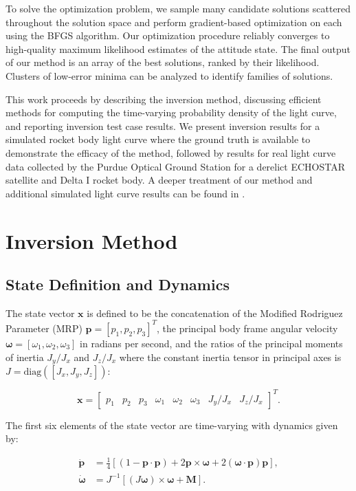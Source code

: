 \documentclass[a4paper,twocolumn]{spaceDebrisC} %
\newcommand{\vctr}[1]{\bm{#1}}
\begin{document}
To solve the optimization problem, we sample many candidate solutions scattered throughout the solution space and perform gradient-based optimization on each using the BFGS algorithm. Our optimization procedure reliably converges to high-quality maximum likelihood estimates of the attitude state. The final output of our method is an array of the best solutions, ranked by their likelihood. Clusters of low-error minima can be analyzed to identify families of solutions.

This work proceeds by describing the inversion method, discussing efficient methods for computing the time-varying probability density of the light curve, and reporting inversion test case results. We present inversion results for a simulated rocket body light curve where the ground truth is available to demonstrate the efficacy of the method, followed by results for real light curve data collected by the Purdue Optical Ground Station for a derelict ECHOSTAR satellite and Delta I rocket body. A deeper treatment of our method and additional simulated light curve results can be found in \cite{robinson2025att}.

\section{Inversion Method}

\subsection{State Definition and Dynamics}

The state vector $\vctr{x}$ is defined to be the concatenation of the Modified Rodriguez Parameter (MRP) $\vctr{p} = [p_1, p_2, p_3]^T$, the principal body frame angular velocity $\vctr{\omega} = [\omega_1, \omega_2, \omega_3]$ in radians per second, and the ratios of the principal moments of inertia $J_y / J_x$ and $J_z / J_x$ where the constant inertia tensor in principal axes is $J = \mathrm{diag}\left([J_x, J_y, J_z]\right)$:

\begin{equation}
 \vctr{x} = \begin{bmatrix} 
 p_1 & p_2 & p_3 & \omega_1 & \omega_2 & \omega_3 & J_y / J_x & J_z / J_x
  \end{bmatrix}^T.
\end{equation}

The first six elements of the state vector are time-varying with dynamics given by:

\begin{align}
 \vctr{\dot{p}} &= \frac{1}{4} \left[ \left(1 - \vctr{p} \cdot \vctr{p}\right) + 2\vctr{p} \times \vctr{\omega} + 2 \left(\vctr{\omega} \cdot \vctr{p} \right)\vctr{p} \right], \label{eq:mrp_kde} \\
 \vctr{\dot{\omega}} &= J^{-1} \left[ \left(J \vctr{\omega}\right) \times \vctr{\omega} + \vctr{M}\right]. \label{eq:rbtf_dynamics}
\end{align}
\end{document}
